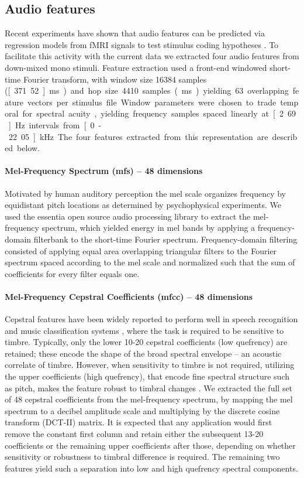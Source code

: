 \documentclass[10pt,a4paper,twocolumn]{article}
\begin{document}
\subsection*{Audio features}

Recent experiments have shown that audio features can be predicted via
regression models from fMRI signals to test stimulus coding hypotheses
\cite{CTK+2012,TAB+2014}.  To facilitate this activity with the current data we
extracted four audio features from down-mixed mono stimuli. Feature extraction
used a front-end windowed short-time Fourier transform, with window size 16384
samples (\unit[371.52]{ms}) and hop size 4410 samples (\unit[100]{ms}) yielding
63 overlapping feature vectors per stimulus file.  Window parameters were
chosen to trade temporal for spectral acuity, yielding frequency samples spaced
linearly at \unit[2.69]{Hz} intervals from \unit[0-22.05]{kHz}. The four
features extracted from this representation are described below.


\paragraph{Mel-Frequency Spectrum (mfs) -- 48 dimensions}
%
Motivated by human auditory perception the mel scale organizes frequency by
equidistant pitch locations as determined by psychophysical experiments. We
used the essentia open source audio processing library \cite{BWG+2013} to
extract the mel-frequency spectrum, which yielded energy in mel bands by
applying a frequency-domain filterbank \cite{GFK2005} to the short-time Fourier
spectrum.  Frequency-domain filtering consisted of applying equal area
overlapping triangular filters to the Fourier spectrum spaced according to the
mel scale and normalized such that the sum of coefficients for every filter
equals one.

\paragraph{Mel-Frequency Cepstral Coefficients (mfcc) -- 48 dimensions}
%
Cepstral features have been widely reported to perform well in speech
recognition and music classification systems \cite{LS2001}, where the task is
required to be sensitive to timbre.  Typically, only the lower 10-20 cepstral
coefficients (low quefrency) are retained; these encode the shape of the broad
spectral envelope -- an acoustic correlate of timbre.  However, when
sensitivity to timbre is not required, utilizing the upper coefficients (high
quefrency), that encode fine spectral structure such as pitch, makes the
feature robust to timbral changes \cite{MEK2009}. We extracted the full set of
48 cepstral coefficients from the mel-frequency spectrum, by mapping the mel
spectrum to a decibel amplitude scale and multiplying by the discrete cosine
transform (DCT-II) matrix. It is expected that any application would first
remove the constant first column and retain either the subsequent 13-20
coefficients or the remaining upper coefficients after those, depending on
whether sensitivity or robustness to timbral difference is required. The
remaining two features yield such a separation into low and high quefrency
spectral components.
\end{document}
